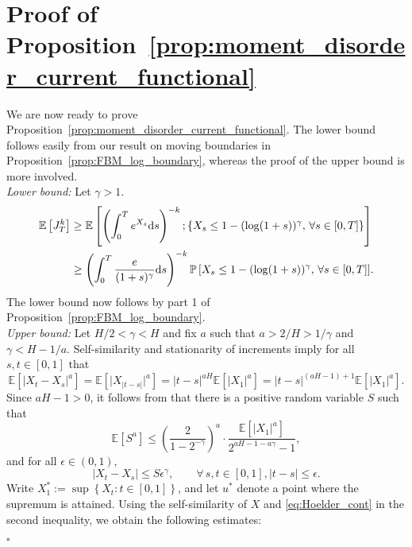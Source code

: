 \documentclass[11pt]{article}
\theoremstyle{plain}
\theoremstyle{definition}
\renewenvironment{proof}[1][] {\smallskip \noindent {\bf Proof#1.} }{\hspace*{\fill}$\square$\medskip\par}
\begin{document}
\section{Proof of Proposition~\ref{prop:moment_disorder_current_functional}} \label{sec:proof_fbm_moment_of_funct}
We are now ready to prove Proposition~\ref{prop:moment_disorder_current_functional}. The lower bound follows easily from our result on moving boundaries in Proposition~\ref{prop:FBM_log_boundary}, whereas the proof of the upper bound is more involved. 
\begin{proof}[ of Proposition~\ref{prop:moment_disorder_current_functional}] \\
\textit{Lower bound:} Let $\gamma > 1$.
 \begin{align*}
      {\mathbb{E}\left[{J_T^k}\right]} &\ge {\mathbb{E}\left[{ \left( \int_0^T e^{X_s} {{\rm d}} s \right)^{-k} ; \lbrace X_s \le 1 - (\log(1+s))^\gamma, \, \forall s \in [0,T] \rbrace }\right]} \\
&\ge  \left( \int_0^T \frac{e}{(1+s)^\gamma} {{\rm d}} s \right)^{-k}  {{{\bf {\mathbb{P}}}}\left[{X_s \le 1 - (\log(1+s))^\gamma, \, \forall s \in [0,T]}\right]}.
 \end{align*}
The lower bound now follows by part 1 of Proposition~\ref{prop:FBM_log_boundary}.\\
\textit{Upper bound:} Let $H/2 < \gamma < H$ and fix $a$ such that $a > 2/H > 1/\gamma$ and $\gamma < H -1/a$. Self-similarity and stationarity of increments imply for all $s,t \in [0,1]$ that
\[
   {\mathbb{E}\left[{{\lvert{X_t - X_s}\rvert}^a}\right]} = {\mathbb{E}\left[{{\lvert{X_{{\lvert{t-s}\rvert}}}\rvert}^a}\right]} = {\lvert{t-s}\rvert}^{aH} {\mathbb{E}\left[{{\lvert{X_1}\rvert}^a}\right]} = {\lvert{t-s}\rvert}^{(aH-1) + 1} {\mathbb{E}\left[{{\lvert{X_1}\rvert}^a}\right]}.
\]
Since $aH-1 > 0$, it follows from \cite[Lemma~2.1]{scheutzow:2009} that there is a positive random variable $S$ such that
\begin{equation}\label{eq:expect_Hoelder_constant}
   {\mathbb{E}\left[{S^a}\right]} \le \left( \frac{2}{1-2^{-\gamma}} \right)^a \cdot \frac{{\mathbb{E}\left[{{\lvert{X_1}\rvert}^a}\right]}}{2^{aH-1-a\gamma} - 1},
\end{equation}
and for all $\epsilon \in (0,1)$,
\begin{equation}\label{eq:Hoelder_cont}
    {\lvert{X_t - X_s}\rvert} \le S \epsilon^\gamma, \qquad \forall \, s,t \in [0,1], {\lvert{t-s}\rvert} \le \epsilon.
\end{equation}
Write $X^*_1 := \sup {\left\lbrace {X_t : t \in [0,1]} \right\rbrace}$, and let $u^*$ denote a point where the supremum is attained. Using the self-similarity of $X$ and \eqref{eq:Hoelder_cont} in the second inequality, we obtain the following estimates:

\end{proof}
\end{document}

